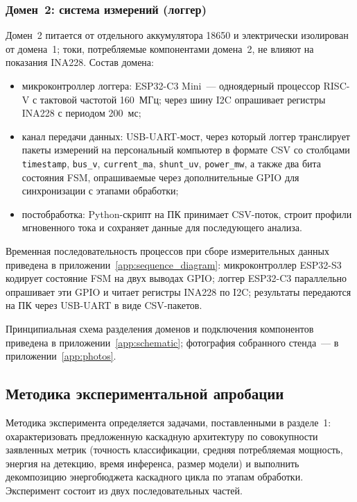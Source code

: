 \subsubsection{Домен~2: система измерений (логгер)}

Домен~2 питается от отдельного аккумулятора 18650 и
электрически изолирован от домена~1; токи, потребляемые
компонентами домена~2, не влияют на показания INA228. Состав
домена:

\begin{itemize}
	\item микроконтроллер логгера: ESP32-C3 Mini~---
	      одноядерный процессор RISC-V с тактовой частотой
	      160~МГц; через шину I2C опрашивает регистры INA228 с
	      периодом 200~мс;
	\item канал передачи данных: USB-UART-мост, через который
	      логгер транслирует пакеты измерений на персональный
	      компьютер в формате CSV со столбцами
	      \texttt{timestamp}, \texttt{bus\_v},
	      \texttt{current\_ma}, \texttt{shunt\_uv},
	      \texttt{power\_mw}, а также два бита состояния FSM,
	      опрашиваемые через дополнительные GPIO для
	      синхронизации с этапами обработки;
	\item постобработка: Python-скрипт на ПК принимает CSV-поток,
	      строит профили мгновенного тока и сохраняет данные для
	      последующего анализа.
\end{itemize}

Временная последовательность процессов при сборе измерительных
данных приведена в приложении~\ref{app:sequence_diagram}:
микроконтроллер ESP32-S3 кодирует состояние FSM на двух выводах GPIO;
логгер ESP32-C3 параллельно опрашивает эти GPIO и читает регистры
INA228 по I2C; результаты передаются на ПК через USB-UART в
виде CSV-пакетов.

Принципиальная схема разделения доменов и подключения
компонентов приведена в приложении~\ref{app:schematic};
фотография собранного стенда~--- в приложении~\ref{app:photos}.

\subsection{Методика экспериментальной апробации}

Методика эксперимента определяется задачами, поставленными в
разделе~1: охарактеризовать предложенную каскадную архитектуру
по совокупности заявленных метрик (точность классификации,
средняя потребляемая мощность, энергия на детекцию, время
инференса, размер модели) и выполнить декомпозицию энергобюджета
каскадного цикла по этапам обработки. Эксперимент состоит из
двух последовательных частей.

